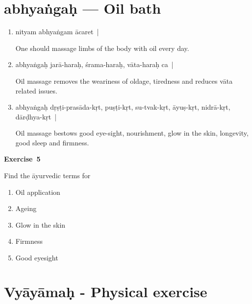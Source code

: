 \chapter{abhyaṅgaḥ --- Oil bath}

\begin{enumerate}
\itemsep=0pt
\item {}

nityam abhyaṅgam ācaret~|

One should massage limbs of the body with oil every day. 

\item {}

abhyaṅgaḥ jarā-haraḥ, śrama-haraḥ, vāta-haraḥ ca~|

Oil massage removes the weariness of oldage, tiredness and reduces vāta related issues.

\item {}

abhyaṅgaḥ dṛṣṭi-prasāda-kṛt, puṣṭi-kṛt, su-tvak-kṛt, āyuṣ-kṛt, nidrā-kṛt, dārḍhya-kṛt~| 

Oil massage bestows good eye-sight, nourishment, glow in the skin, longevity, good sleep and firmness.
\end{enumerate}

\centerline{\textbf{Exercise~5}}


Find the āyurvedic terms for
\begin{enumerate}
\itemsep=0pt
\renewcommand{\theenumi}{\alph{enumi}}
\renewcommand{\labelenumi}{\theenumi.}
\item Oil application
\item Ageing
\item Glow in the skin
\item Firmness
\item Good eyesight
\end{enumerate}

\chapter{Vyāyāmaḥ - Physical exercise}

